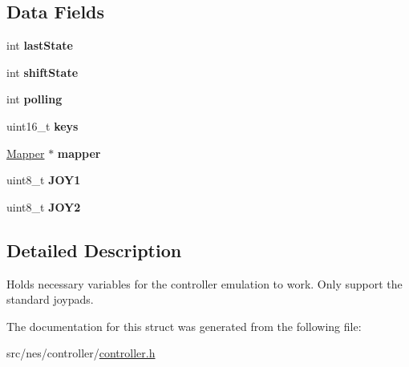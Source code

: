 \subsection*{Data Fields}
\begin{DoxyCompactItemize}
\item 
\mbox{\label{struct_controller_a7c8d04b2a02a38530a7bbb870be9f094}} 
int {\bfseries last\+State}
\item 
\mbox{\label{struct_controller_aa19f89fe7163aff8f62b6e4436e8cca1}} 
int {\bfseries shift\+State}
\item 
\mbox{\label{struct_controller_a4eded182e423bbc78b60656212249e42}} 
int {\bfseries polling}
\item 
\mbox{\label{struct_controller_a491d7829583d7ed7aa1e18ec246366e2}} 
uint16\+\_\+t {\bfseries keys}
\item 
\mbox{\label{struct_controller_a2a9230344a369ccd1d395edd03dd6827}} 
\hyperlink{struct_mapper}{Mapper} $\ast$ {\bfseries mapper}
\item 
\mbox{\label{struct_controller_a6fab29dc7e4f8b40ebb1accd52237a4a}} 
uint8\+\_\+t {\bfseries J\+O\+Y1}
\item 
\mbox{\label{struct_controller_a4b143bcfc6b5049d4cbf8af325d4997a}} 
uint8\+\_\+t {\bfseries J\+O\+Y2}
\end{DoxyCompactItemize}


\subsection{Detailed Description}
Holds necessary variables for the controller emulation to work. Only support the standard joypads. 

The documentation for this struct was generated from the following file\+:\begin{DoxyCompactItemize}
\item 
src/nes/controller/\hyperlink{controller_8h}{controller.\+h}\end{DoxyCompactItemize}
